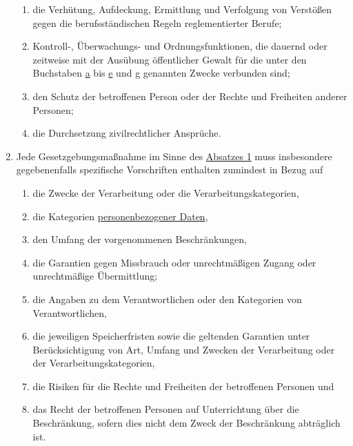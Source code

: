 \begin{enumerate}
\begin{enumerate}
    \item die Verhütung, Aufdeckung, Ermittlung und Verfolgung von Verstößen gegen die berufsständischen Regeln
     reglementierter Berufe;
    \label{itm:23-1g}

    \item Kontroll-, Überwachungs- und Ordnungsfunktionen, die dauernd oder zeitweise mit der Ausübung öffentlicher
     Gewalt für die unter den Buchstaben \hyperref[itm:23-1a]{a} bis \hyperref[itm:23-1e]{e} und \hyperref[itm:23-1g]
     {g} genannten Zwecke verbunden sind;
    \label{itm:23-1h}

    \item den Schutz der betroffenen Person oder der Rechte und Freiheiten anderer Personen;
    \label{itm:23-1i}

    \item die Durchsetzung zivilrechtlicher Ansprüche.
    \label{itm:23-1j}

  \end{enumerate}

  \item Jede Gesetzgebungsmaßnahme im Sinne des \hyperref[itm:23-1]{Absatzes 1} muss insbesondere gegebenenfalls
   spezifische Vorschriften enthalten zumindest in Bezug auf
  \label{itm:23-2}

  \begin{enumerate}
  
    \item die Zwecke der Verarbeitung oder die Verarbeitungskategorien,
    \label{itm:23-2a}

    \item die Kategorien \hyperref[itm:04-1]{personenbezogener Daten},
    \label{itm:23-2b}

    \item den Umfang der vorgenommenen Beschränkungen,
    \label{itm:23-2c}

    \item die Garantien gegen Missbrauch oder unrechtmäßigen Zugang oder unrechtmäßige Übermittlung;
    \label{itm:23-2d}

    \item die Angaben zu dem Verantwortlichen oder den Kategorien von Verantwortlichen,
    \label{itm:23-2e}

    \item die jeweiligen Speicherfristen sowie die geltenden Garantien unter Berücksichtigung von Art, Umfang und
     Zwecken der Verarbeitung oder der Verarbeitungskategorien,
    \label{itm:23-2f}

    \item die Risiken für die Rechte und Freiheiten der betroffenen Personen und
    \label{itm:23-2g}

    \item das Recht der betroffenen Personen auf Unterrichtung über die Beschränkung, sofern dies nicht dem Zweck der
     Beschränkung abträglich ist.
    \label{itm:23-2h}

  \end{enumerate}

\end{enumerate}


